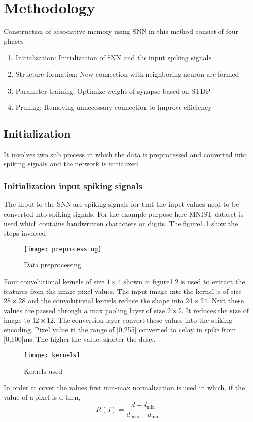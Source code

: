 \chapter{Methodology}

Construction of associative memory using SNN\cite{base} in this method consist
of four phases
\begin{enumerate}
    \itemsep0em
    \item Initialization: Initialization of SNN and the input spiking signals
    \item Structure formation: New connection with neighboring neuron are formed
    \item Parameter training: Optimize weight of synapse based on STDP
    \item Pruning: Removing unnecessary connection to improve efficiency
\end{enumerate}
\section{Initialization}
It involves two sub process in which the data is preprocessed and converted
into spiking signals and the network is initialized
\subsection{Initialization input spiking signals}
The input to the SNN are spiking signals for that the input values need to be
converted into spiking signals. For the example purpose here MNIST dataset is
used which contains handwritten characters on digits. The
figure\ref{preprocessing} show the steps involved

\begin{figure}[h!]
    \centering
    \texttt{[image: preprocessing]}
    \caption{Data preprocessing}\label{preprocessing}
\end{figure}

Four convolutional kernels of size $4\times4$ shown in figure\ref{kernel} is
used to extract the features from the image pixel values. The input image into
the kernel is of size $28\times28$ and the convolutional kernels reduce the
shape into $24\times24$. Next these values are passed through a max pooling
layer of size $2\times2$. It reduces the size of image to $12\times12$. The
conversion layer convert these values into the spiking encoding. Pixel value in
the range of [0,255] converted to delay in spike from [0,100]ms. The higher the
value, shorter the delay.
\begin{figure}[h!]
    \centering
    \texttt{[image: kernels]}
    \caption{Kernels used}\label{kernel}
\end{figure}
In order to cover the values first min-max normalization is used in which, if
the value of a pixel is d then,
\begin{equation*}
    R(d)=\frac{d-d_{\min}}{d_{\max}-d_{\min}}
\end{equation*}

